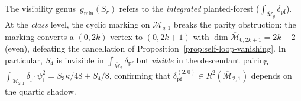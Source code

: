 \begin{remark}
\label{rem:class-vs-integrated-visibility}
The visibility genus~$g_{\min}(S_r)$ refers to the
\emph{integrated} planted-forest
($\int_{\overline{\mathcal{M}}_g}\delta_{\mathrm{pf}}$).
At the \emph{class} level, the cyclic marking on
$\overline{\mathcal{M}}_{g,1}$ breaks the parity obstruction:
the marking converts a $(0,2k)$ vertex to $(0,2k{+}1)$
with $\dim\overline{\mathcal{M}}_{0,2k+1} = 2k{-}2$ (even),
defeating the cancellation of
Proposition~\ref{prop:self-loop-vanishing}.
In particular, $S_4$ is invisible in
$\int_{\overline{\mathcal{M}}_2}\delta_{\mathrm{pf}}$
but \emph{visible} in the descendant pairing
$\int_{\overline{\mathcal{M}}_{2,1}}
\delta_{\mathrm{pf}}\,\psi_1^2 = S_3\kappa/48 + S_4/8$,
confirming that $\delta_{\mathrm{pf}}^{(2,0)}
\in R^2(\overline{\mathcal{M}}_{2,1})$ depends on the quartic shadow.
\end{remark}

